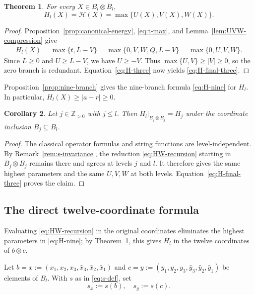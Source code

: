 \documentclass[11pt,reqno]{amsart}
\newcommand{\Z}{\mathbb Z}
\newcommand{\HH}{\mathcal H}
\numberwithin{table}{section}
\numberwithin{equation}{section}
\theoremstyle{plain}
\newtheorem{theorem}{Theorem}[section]
\newtheorem{corollary}[theorem]{Corollary}
\theoremstyle{definition}
\begin{document}
\begin{theorem}\label{thm:energy}
	For every \(X\in B_l\otimes B_l\),
	\begin{equation}\label{eq:H-final-three}
		H_l(X)
		=
		\HH(X)
		=
		\max\{U(X),V(X),W(X)\}.
	\end{equation}
\end{theorem}

\begin{proof}
	Proposition~\ref{prop:canonical-energy},
	\eqref{eq:t-max}, and
	Lemma~\ref{lem:UVW-compression} give
	\[
	\begin{aligned}
		H_l(X)
		=\max\{t,L-V\}
		=\max\{0,V,W,Q,L-V\}
		=\max\{0,U,V,W\}.
	\end{aligned}
	\]
	Since \(L\ge0\) and \(U\ge L-V\), we have \(U\ge -V\).
	Thus \(\max\{U,V\}\ge |V|\ge0\), so the zero branch
	is redundant.
	Equation~\eqref{eq:H-three} now yields
	\eqref{eq:H-final-three}.
\end{proof}

Proposition~\ref{prop:nine-branch} gives the nine-branch formula
\eqref{eq:H-nine} for \(H_l\).
In particular, \(H_l(X)\ge |a-r|\ge0\).

\begin{corollary}\label{cor:level-stability}
	Let \(j\in\Z_{>0}\) with \(j\le l\). Then $H_l\big|_{B_j\otimes B_j}=H_j$
	under the coordinate inclusion \(B_j\subseteq B_l\).
\end{corollary}

\begin{proof}
	The classical operator formulas and string functions are
	level-independent.
	By Remark~\ref{rem:s-invariance}, the reduction
	\eqref{eq:HW-recursion} starting in \(B_j\otimes B_j\)
	remains there and agrees at levels \(j\) and \(l\).
	It therefore gives the same highest parameters and the same
	\(U,V,W\) at both levels.
	Equation~\eqref{eq:H-final-three} proves the claim.
\end{proof}

\subsection{The direct twelve-coordinate formula}

Evaluating \eqref{eq:HW-recursion} in the original coordinates
eliminates the highest parameters in \eqref{eq:H-nine}; by
Theorem~\ref{thm:energy}, this gives \(H_l\) in the twelve
coordinates of \(b\otimes c\).

Let $b=x:=(x_1,x_2,x_3,\bar x_3,\bar x_2,\bar x_1)$ and $c=y:=(y_1,y_2,y_3,\bar y_3,\bar y_2,\bar y_1)$
be elements of \(B_l\).
With \(s\) as in \eqref{eq:s-def}, set
\begin{equation}\label{eq:twelve-sx}
	s_x:=s(b),
	\quad
	s_y:=s(c).
\end{equation}
\end{document}
